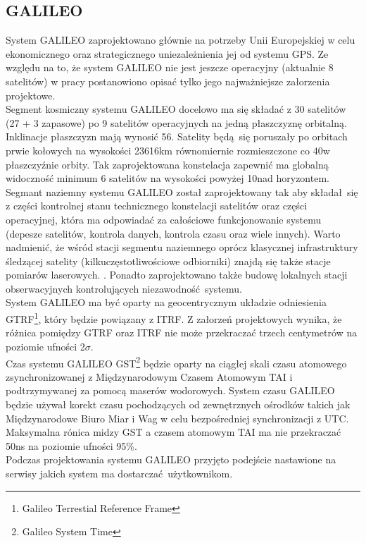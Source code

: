 	\subsection{GALILEO}
System GALILEO zaprojektowano głównie na potrzeby Unii Europejskiej w celu ekonomicznego oraz strategicznego uniezależnienia jej od systemu GPS.
Ze względu na to, że system GALILEO nie jest jeszcze operacyjny (aktualnie 8 satelitów) w pracy postanowiono opisać tylko jego najważniejsze załorzenia projektowe.\\
\indent Segment kosmiczny systemu GALILEO docelowo ma się składać z 30 satelitów (27 + 3 zapasowe) po 9 satelitów operacyjnych na jedną płaszczyznę orbitalną.
Inklinacje płaszczyzn mają wynosić 56\degree. Satelity będą się poruszały po orbitach prwie kołowych na wysokości 23616km równomiernie rozmieszczone co 40\degree w 
płaszczyźnie orbity. Tak zaprojektowana konstelacja zapewnić ma globalną widoczność minimum 6 satelitów na wysokości powyżej 10\degree nad horyzontem.\\
\indent Segmant naziemny systemu GALILEO został zaprojektowany tak aby składał się z części kontrolnej stanu technicznego konstelacji satelitów oraz 
części operacyjnej, która ma odpowiadać za całościowe funkcjonowanie systemu (depesze satelitów, kontrola danych, kontrola czasu oraz wiele innych). Warto nadmienić,
że wśród stacji segmentu naziemnego oprócz klasycznej infrastruktury śledzącej satelity (kilkuczęstotliwościowe odbiorniki) znajdą się także stacje pomiarów laserowych.
\cite[][strona 380]{hofmann_gnss}. Ponadto zaprojektowano także budowę lokalnych stacji obserwacyjnych kontrolujących niezawodność systemu.\\
\indent System GALILEO ma być oparty na geocentrycznym układzie odniesienia GTRF\footnote{Galileo Terrestial Reference Frame}, który będzie powiązany z ITRF.
Z załorzeń projektowych wynika, że różnica pomiędzy GTRF oraz ITRF nie może przekraczać trzech centymetrów na poziomie ufności 2$\sigma$.\\
\indent Czas systemu GALILEO GST\footnote{Galileo System Time} będzie oparty na ciągłej skali czasu atomowego zsynchronizowanej z Międzynarodowym Czasem Atomowym TAI i
podtrzymywanej za pomocą maserów wodorowych. System czasu GALILEO będzie używał korekt czasu pochodzących od zewnętrznych ośrodków takich jak Międzynarodowe 
Biuro Miar i Wag w celu bezpośredniej synchronizacji z UTC. Maksymalna rónica midzy GST a czasem atomowym TAI ma nie przekraczać 50ns na poziomie ufności 95\%.\\
\indent Podczas projektowania systemu GALILEO przyjęto podejście nastawione na serwisy jakich system ma dostarczać użytkownikom.
